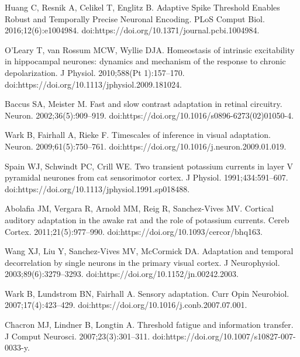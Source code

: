 \documentclass[10pt,letterpaper]{article}
\begin{document}
\begin{thebibliography}{100}
  Huang C, Resnik A, Celikel T, Englitz B.
  \newblock Adaptive Spike Threshold Enables Robust and Temporally Precise
    Neuronal Encoding.
  \newblock PLoS Comput Biol. 2016;12(6):e1004984.
  \newblock doi:{https://doi.org/10.1371/journal.pcbi.1004984}.
  
  O'Leary T, van Rossum MCW, Wyllie DJA.
  \newblock Homeostasis of intrinsic excitability in hippocampal neurones:
    dynamics and mechanism of the response to chronic depolarization.
  \newblock J Physiol. 2010;588(Pt 1):157--170.
  \newblock doi:{https://doi.org/10.1113/jphysiol.2009.181024}.
  
  Baccus SA, Meister M.
  \newblock Fast and slow contrast adaptation in retinal circuitry.
  \newblock Neuron. 2002;36(5):909--919.
  \newblock doi:{https://doi.org/10.1016/s0896-6273(02)01050-4}.
  
  Wark B, Fairhall A, Rieke F.
  \newblock Timescales of inference in visual adaptation.
  \newblock Neuron. 2009;61(5):750--761.
  \newblock doi:{https://doi.org/10.1016/j.neuron.2009.01.019}.
  
  Spain WJ, Schwindt PC, Crill WE.
  \newblock Two transient potassium currents in layer {V} pyramidal neurones from
    cat sensorimotor cortex.
  \newblock J Physiol. 1991;434:591--607.
  \newblock doi:{https://doi.org/10.1113/jphysiol.1991.sp018488}.
  
  Abolafia JM, Vergara R, Arnold MM, Reig R, Sanchez-Vives MV.
  \newblock Cortical auditory adaptation in the awake rat and the role of
    potassium currents.
  \newblock Cereb Cortex. 2011;21(5):977--990.
  \newblock doi:{https://doi.org/10.1093/cercor/bhq163}.
  
  Wang XJ, Liu Y, Sanchez-Vives MV, McCormick DA.
  \newblock Adaptation and temporal decorrelation by single neurons in the
    primary visual cortex.
  \newblock J Neurophysiol. 2003;89(6):3279--3293.
  \newblock doi:{https://doi.org/10.1152/jn.00242.2003}.
  
  Wark B, Lundstrom BN, Fairhall A.
  \newblock Sensory adaptation.
  \newblock Curr Opin Neurobiol. 2007;17(4):423--429.
  \newblock doi:{https://doi.org/10.1016/j.conb.2007.07.001}.
  
  Chacron MJ, Lindner B, Longtin A.
  \newblock Threshold fatigue and information transfer.
  \newblock J Comput Neurosci. 2007;23(3):301--311.
  \newblock doi:{https://doi.org/10.1007/s10827-007-0033-y}.
  

\end{thebibliography}
\end{document}
